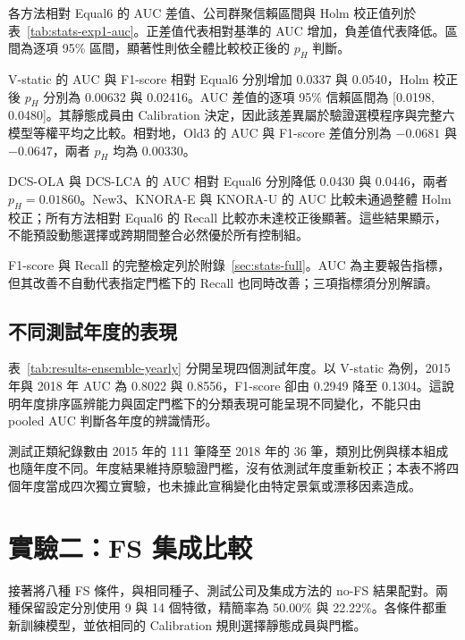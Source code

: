 

各方法相對 Equal6 的 AUC 差值、公司群聚信賴區間與 Holm 校正值列於表~\ref{tab:stats-exp1-auc}。正差值代表相對基準的 AUC 增加，負差值代表降低。區間為逐項 95\% 區間，顯著性則依全體比較校正後的 \(p_H\) 判斷。



V-static 的 AUC 與 F1-score 相對 Equal6 分別增加 0.0337 與 0.0540，Holm 校正後 \(p_H\) 分別為 0.00632 與 0.02416。AUC 差值的逐項 95\% 信賴區間為 [0.0198, 0.0480]。其靜態成員由 Calibration 決定，因此該差異屬於驗證選模程序與完整六模型等權平均之比較。相對地，Old3 的 AUC 與 F1-score 差值分別為 \(-0.0681\) 與 \(-0.0647\)，兩者 \(p_H\) 均為 0.00330。

DCS-OLA 與 DCS-LCA 的 AUC 相對 Equal6 分別降低 0.0430 與 0.0446，兩者 \(p_H=0.01860\)。New3、KNORA-E 與 KNORA-U 的 AUC 比較未通過整體 Holm 校正；所有方法相對 Equal6 的 Recall 比較亦未達校正後顯著。這些結果顯示，不能預設動態選擇或跨期間整合必然優於所有控制組。

F1-score 與 Recall 的完整檢定列於附錄~\ref{sec:stats-full}。AUC 為主要報告指標，但其改善不自動代表指定門檻下的 Recall 也同時改善；三項指標須分別解讀。

\subsection{不同測試年度的表現}



表~\ref{tab:results-ensemble-yearly} 分開呈現四個測試年度。以 V-static 為例，2015 年與 2018 年 AUC 為 0.8022 與 0.8556，F1-score 卻由 0.2949 降至 0.1304。這說明年度排序區辨能力與固定門檻下的分類表現可能呈現不同變化，不能只由 pooled AUC 判斷各年度的辨識情形。

測試正類紀錄數由 2015 年的 111 筆降至 2018 年的 36 筆，類別比例與樣本組成也隨年度不同。年度結果維持原驗證門檻，沒有依測試年度重新校正；本表不將四個年度當成四次獨立實驗，也未據此宣稱變化由特定景氣或漂移因素造成。

\section{實驗二：FS 集成比較}\label{sec:results-experiment2}

接著將八種 FS 條件，與相同種子、測試公司及集成方法的 no-FS 結果配對。兩種保留設定分別使用 9 與 14 個特徵，精簡率為 50.00\% 與 22.22\%。各條件都重新訓練模型，並依相同的 Calibration 規則選擇靜態成員與門檻。

